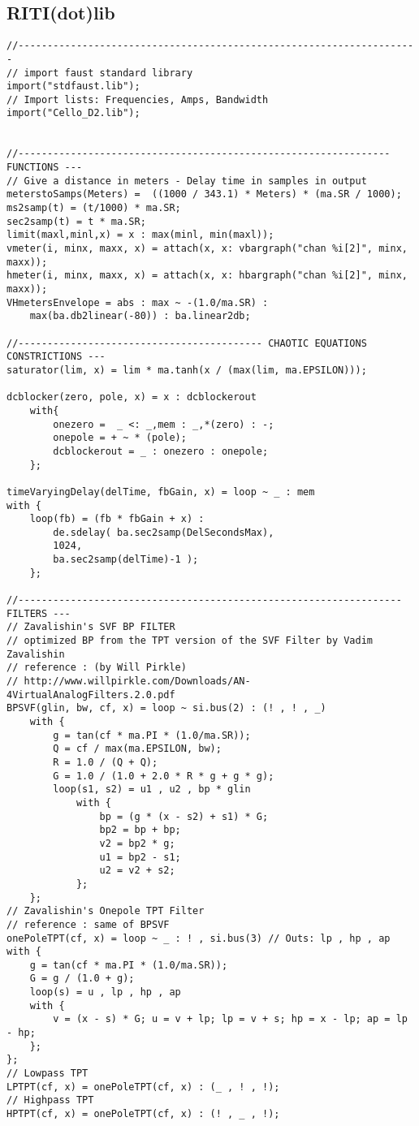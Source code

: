 \subsection{RITI(dot)lib}

\vspace{0.5cm}
\begin{lstlisting}
//---------------------------------------------------------------------
// import faust standard library
import("stdfaust.lib");
// Import lists: Frequencies, Amps, Bandwidth
import("Cello_D2.lib");


//---------------------------------------------------------------- FUNCTIONS ---
// Give a distance in meters - Delay time in samples in output
meterstoSamps(Meters) =  ((1000 / 343.1) * Meters) * (ma.SR / 1000);
ms2samp(t) = (t/1000) * ma.SR;
sec2samp(t) = t * ma.SR;
limit(maxl,minl,x) = x : max(minl, min(maxl));
vmeter(i, minx, maxx, x) = attach(x, x: vbargraph("chan %i[2]", minx, maxx));
hmeter(i, minx, maxx, x) = attach(x, x: hbargraph("chan %i[2]", minx, maxx));
VHmetersEnvelope = abs : max ~ -(1.0/ma.SR) : 
    max(ba.db2linear(-80)) : ba.linear2db;

//------------------------------------------ CHAOTIC EQUATIONS CONSTRICTIONS ---
saturator(lim, x) = lim * ma.tanh(x / (max(lim, ma.EPSILON)));

dcblocker(zero, pole, x) = x : dcblockerout
    with{
        onezero =  _ <: _,mem : _,*(zero) : -;
        onepole = + ~ * (pole);
        dcblockerout = _ : onezero : onepole;
    };

timeVaryingDelay(delTime, fbGain, x) = loop ~ _ : mem
with {  
    loop(fb) = (fb * fbGain + x) : 
        de.sdelay( ba.sec2samp(DelSecondsMax), 
        1024, 
        ba.sec2samp(delTime)-1 );
    };

//------------------------------------------------------------------ FILTERS ---
// Zavalishin's SVF BP FILTER
// optimized BP from the TPT version of the SVF Filter by Vadim Zavalishin
// reference : (by Will Pirkle)
// http://www.willpirkle.com/Downloads/AN-4VirtualAnalogFilters.2.0.pdf
BPSVF(glin, bw, cf, x) = loop ~ si.bus(2) : (! , ! , _)
    with {
        g = tan(cf * ma.PI * (1.0/ma.SR));
        Q = cf / max(ma.EPSILON, bw);
        R = 1.0 / (Q + Q);
        G = 1.0 / (1.0 + 2.0 * R * g + g * g);
        loop(s1, s2) = u1 , u2 , bp * glin
            with {
                bp = (g * (x - s2) + s1) * G;
                bp2 = bp + bp;
                v2 = bp2 * g;
                u1 = bp2 - s1;
                u2 = v2 + s2;
            };
    };
// Zavalishin's Onepole TPT Filter
// reference : same of BPSVF
onePoleTPT(cf, x) = loop ~ _ : ! , si.bus(3) // Outs: lp , hp , ap
with {
    g = tan(cf * ma.PI * (1.0/ma.SR));
    G = g / (1.0 + g);
    loop(s) = u , lp , hp , ap
    with {
        v = (x - s) * G; u = v + lp; lp = v + s; hp = x - lp; ap = lp - hp;
    };
};
// Lowpass TPT
LPTPT(cf, x) = onePoleTPT(cf, x) : (_ , ! , !);
// Highpass TPT
HPTPT(cf, x) = onePoleTPT(cf, x) : (! , _ , !);


\end{lstlisting}
